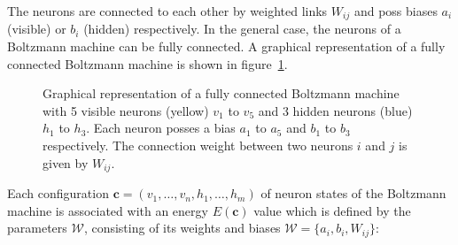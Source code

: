 The neurons are 
connected to each other by weighted links $W_{ij}$ and poss biases $a_i$ (visible) or $b_i$ (hidden) respectively. In the
general case, the neurons of a Boltzmann machine can be fully connected. A graphical representation of a fully connected Boltzmann machine is shown in figure~\ref{fig:boltzmannMachine}.

\begin{figure}[H]
    \label{fig:boltzmannMachine}
    \centering
    \caption[Fully connected Boltzmann Machine]{Graphical representation of a fully connected Boltzmann machine with 5 visible neurons (yellow) $v_1$ to $v_5$
    and 3 hidden neurons (blue) $h_1$ to $h_3$. Each neuron posses a bias
    $a_1$ to $a_5$ and $b_1$ to $b_3$ respectively. The connection weight between two neurons $i$ and $j$
    is given by $W_{ij}$.}
\end{figure}

Each configuration $\bm{c}=(v_1,\dots,v_n,h_1,\dots,h_m)$ of neuron states
of the Boltzmann machine is associated with an energy $E(\bm{c})$ value
which is defined by the parameters $\mathcal{W}$, consisting of its weights and 
biases $\mathcal{W} = \{a_i, b_i, W_{ij}\}$:

